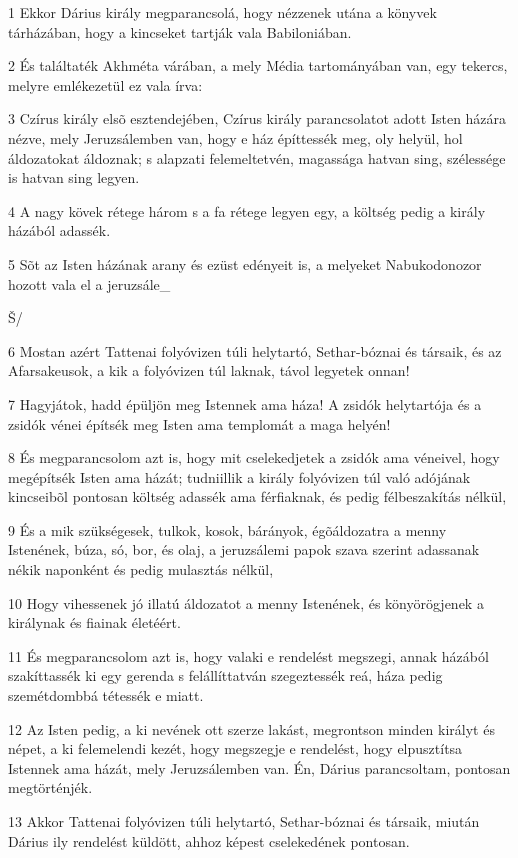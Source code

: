 \par 1 Ekkor Dárius király megparancsolá, hogy nézzenek utána a könyvek tárházában, hogy a kincseket tartják vala Babiloniában.
\par 2 És találtaték Akhméta várában, a mely Média tartományában van, egy tekercs, melyre emlékezetül ez vala írva:
\par 3 Czírus király elsõ esztendejében, Czírus király parancsolatot adott Isten házára nézve, mely Jeruzsálemben van, hogy e ház építtessék meg, oly helyül, hol áldozatokat áldoznak; s alapzati felemeltetvén, magassága hatvan sing, szélessége is hatvan sing legyen.
\par 4 A nagy kövek rétege három s a fa rétege legyen egy, a költség pedig a király házából adassék.
\par 5 Sõt az Isten házának arany és ezüst edényeit is, a melyeket Nabukodonozor hozott vala el a jeruzsále_{Š/
\par 6 Mostan azért Tattenai folyóvizen túli helytartó, Sethar-bóznai és társaik, és az Afarsakeusok, a kik a folyóvizen túl laknak, távol legyetek onnan!
\par 7 Hagyjátok, hadd épüljön meg Istennek ama háza! A zsidók helytartója és a zsidók vénei építsék meg Isten ama templomát a maga helyén!
\par 8 És megparancsolom azt is, hogy mit cselekedjetek a zsidók ama véneivel, hogy megépítsék Isten ama házát; tudniillik a király folyóvizen túl való adójának kincseibõl pontosan költség adassék ama férfiaknak, és pedig félbeszakítás nélkül,
\par 9 És a mik szükségesek, tulkok, kosok, bárányok, égõáldozatra a menny Istenének, búza, só, bor, és olaj, a jeruzsálemi papok szava szerint adassanak nékik naponként és pedig mulasztás nélkül,
\par 10 Hogy vihessenek jó illatú áldozatot a menny Istenének, és könyörögjenek a királynak és fiainak életéért.
\par 11 És megparancsolom azt is, hogy valaki e rendelést megszegi, annak házából szakíttassék ki egy gerenda s felállíttatván szegeztessék reá, háza pedig szemétdombbá tétessék e miatt.
\par 12 Az Isten pedig, a ki nevének ott szerze lakást, megrontson minden királyt és népet, a ki felemelendi kezét, hogy megszegje e rendelést, hogy elpusztítsa Istennek ama házát, mely Jeruzsálemben van. Én, Dárius parancsoltam, pontosan megtörténjék.
\par 13 Akkor Tattenai folyóvizen túli helytartó, Sethar-bóznai és társaik, miután Dárius ily rendelést küldött, ahhoz képest cselekedének pontosan.
}

